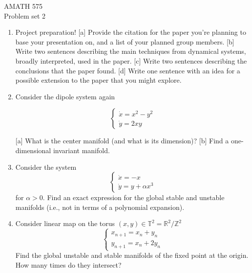 \documentclass{article}
\begin{document}
\begin{center}
AMATH 575 \\
Problem set 2\\[.3in]
\end{center}



\begin{enumerate}
   
 \item Project preparation!  [a]  Provide the citation for the paper you're planning to base your presentation on, and a list of your planned group members.  [b]  Write two sentences describing the main techniques from dynamical systems, broadly interpreted, used in the paper.  [c]  Write two sentences describing the conclusions that the paper found.  [d]  Write one sentence with an idea for a possible extension to the paper that you might explore.  
   
\item Consider the dipole system again

\begin{equation}
\left\{\begin{array}{l}
\dot x= x^2 - y^2  \\
\dot y = 2 x y 
\end{array}\right.
\end{equation}

[a] What is the center manifold (and what is its dimension)?  [b] Find a one-dimensional invariant manifold. 


\item Consider the system 
\begin{equation}
\left\{\begin{array}{l}
\dot x= -x \\
\dot y = y + \alpha x^3 
\end{array}\right.
\end{equation}
for $\alpha>0$.  Find an exact expression for the global stable and unstable manifolds (i.e., not in terms of a polynomial expansion).

\item Consider linear map on the torus $(x,y) \in \mathbb{T}^2 =  \mathbb{R}^2  /  \mathbb{Z}^2$
\begin{equation}
\left\{\begin{array}{l}
x_{n+1} = x_n + y_n \\
y_{n+1} = x_n + 2 y_n  
\end{array}\right.
\end{equation}
Find the global unstable and stable manifolds of the fixed point at the origin.  How many times do they intersect?


\end{enumerate}
\end{document}
